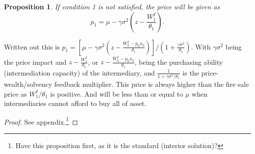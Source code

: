 \documentclass[11pt]{article}
\newtheorem{proposition}{Proposition}
\begin{document}
\begin{appendices}
\begin{proposition} \label{p_pricewoExplosive}
If condition 1 is not satisfied, the price will be given as 
\begin{equation}
p_1 = \mu - \gamma\sigma^2 \left(z-\frac{W^I_1}{\theta_1}\right).
\end{equation}
\end{proposition}
Written out this is $p_1 = \left[\mu - \gamma\sigma^2 \left(z - \frac{W_0^I - p_0 x_0}{\theta_1}\right)\right]/(1+\frac{\gamma\sigma^2}{\theta_1}) $. With $\gamma\sigma^2$ being the price impact and $z-\frac{W^I_1}{\theta_1}$, or $z - \frac{W_0^I - p_0 x_0}{\theta_1}$, being the purchasing ability (intermediation capacity) of the intermediary, and $\frac{1}{1 + \gamma\sigma^2/\theta_1}$ is the price-wealth/solvency feedback multiplier. This price is always higher than the fire sale price as $W^I_1/\theta_1$ is positive. And will be less than or equal to $\mu$ when intermediaries cannot afford to buy all of asset.
\begin{proof}
See appendix.\footnote{Have this proposition first, as it is the standard (interior solution)?}
\end{proof}

\begin{figure}[h]
\centering
{}
\end{figure}
\end{appendices}
\end{document}
